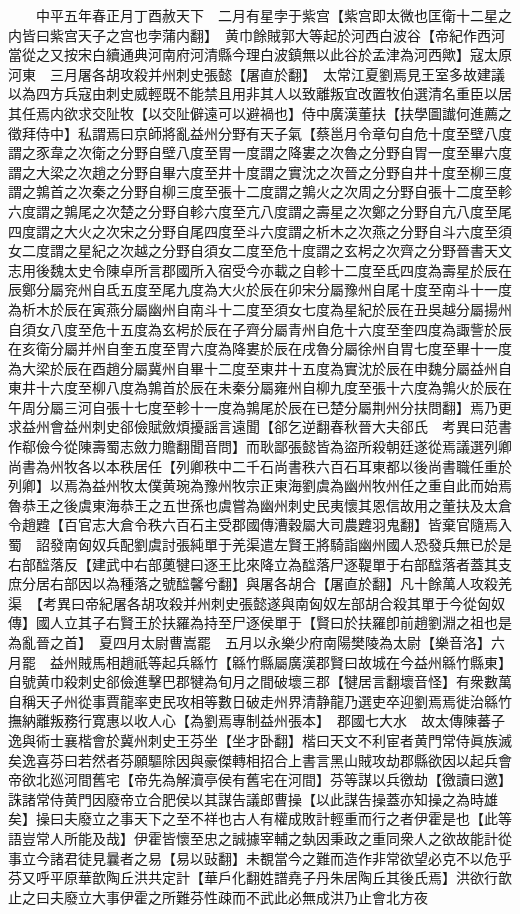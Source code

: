 　　中平五年春正月丁酉赦天下　二月有星孛于紫宫【紫宫即太微也匡衛十二星之内皆曰紫宫天子之宫也孛蒲内翻】　黄巾餘賊郭大等起於河西白波谷【帝紀作西河當從之又按宋白續通典河南府河清縣今理白波鎮無以此谷於孟津為河西歟】寇太原河東　三月屠各胡攻殺并州刺史張懿【屠直於翻】　太常江夏劉焉見王室多故建議以為四方兵寇由刺史威輕既不能禁且用非其人以致離叛宜改置牧伯選清名重臣以居其任焉内欲求交阯牧【以交阯僻遠可以避禍也】侍中廣漢董扶【扶學圖䜟何進薦之徵拜侍中】私謂焉曰京師將亂益州分野有天子氣【蔡邕月令章句自危十度至壁八度謂之豕韋之次衛之分野自壁八度至胃一度謂之降婁之次魯之分野自胃一度至畢六度謂之大梁之次趙之分野自畢六度至井十度謂之實沈之次晉之分野自井十度至柳三度謂之鶉首之次秦之分野自柳三度至張十二度謂之鶉火之次周之分野自張十二度至軫六度謂之鶉尾之次楚之分野自軫六度至亢八度謂之壽星之次鄭之分野自亢八度至尾四度謂之大火之次宋之分野自尾四度至斗六度謂之析木之次燕之分野自斗六度至須女二度謂之星紀之次越之分野自須女二度至危十度謂之玄枵之次齊之分野晉書天文志用後魏太史令陳卓所言郡國所入宿受今亦載之自軫十二度至氐四度為壽星於辰在辰鄭分屬兖州自氐五度至尾九度為大火於辰在卯宋分屬豫州自尾十度至南斗十一度為析木於辰在寅燕分屬幽州自南斗十二度至須女七度為星紀於辰在丑吳越分屬揚州自須女八度至危十五度為玄枵於辰在子齊分屬青州自危十六度至奎四度為諏訾於辰在亥衛分屬并州自奎五度至胃六度為降婁於辰在戌魯分屬徐州自胃七度至畢十一度為大梁於辰在酉趙分屬冀州自畢十二度至東井十五度為實沈於辰在申魏分屬益州自東井十六度至柳八度為鶉首於辰在未秦分屬雍州自柳九度至張十六度為鶉火於辰在午周分屬三河自張十七度至軫十一度為鶉尾於辰在已楚分屬荆州分扶問翻】焉乃更求益州會益州刺史郤儉賦斂煩擾謡言遠聞【郤乞逆翻春秋晉大夫郤氏　考異曰范書作郗儉今從陳壽蜀志斂力贍翻聞音問】而耿鄙張懿皆為盜所殺朝廷遂從焉議選列卿尚書為州牧各以本秩居任【列卿秩中二千石尚書秩六百石耳東都以後尚書職任重於列卿】以焉為益州牧太僕黄琬為豫州牧宗正東海劉虞為幽州牧州任之重自此而始焉魯恭王之後虞東海恭王之五世孫也虞嘗為幽州刺史民夷懷其恩信故用之董扶及太倉令趙韙【百官志大倉令秩六百石主受郡國傳漕穀屬大司農韙羽鬼翻】皆棄官隨焉入蜀　詔發南匈奴兵配劉虞討張純單于羌渠遣左賢王將騎詣幽州國人恐發兵無已於是右部䤈落反【建武中右部薁犍曰逐王比來降立為䤈落尸逐鞮單于右部䤈落者蓋其支庶分居右部因以為種落之號䤈馨兮翻】與屠各胡合【屠直於翻】凡十餘萬人攻殺羌渠　【考異曰帝紀屠各胡攻殺并州刺史張懿遂與南匈奴左部胡合殺其單于今從匈奴傳】國人立其子右賢王於扶羅為持至尸逐侯單于【賢曰於扶羅卽前趙劉淵之祖也是為亂晉之首】　夏四月太尉曹嵩罷　五月以永樂少府南陽樊陵為太尉【樂音洛】六月罷　益州賊馬相趙祇等起兵緜竹【緜竹縣屬廣漢郡賢曰故城在今益州緜竹縣東】自號黄巾殺刺史郤儉進擊巴郡犍為旬月之間破壞三郡【犍居言翻壞音怪】有衆數萬自稱天子州從事賈龍率吏民攻相等數日破走州界清静龍乃選吏卒迎劉焉焉徙治緜竹撫納離叛務行寛惠以收人心【為劉焉專制益州張本】　郡國七大水　故太傳陳蕃子逸與術士襄楷會於冀州刺史王芬坐【坐才卧翻】楷曰天文不利宦者黄門常侍眞族滅矣逸喜芬曰若然者芬願驅除因與豪傑轉相招合上書言黑山賊攻劫郡縣欲因以起兵會帝欲北廵河間舊宅【帝先為解瀆亭侯有舊宅在河間】芬等謀以兵徼劫【徼讀曰邀】誅諸常侍黄門因廢帝立合肥侯以其謀告議郎曹操【以此謀告操蓋亦知操之為時雄矣】操曰夫廢立之事天下之至不祥也古人有權成敗計輕重而行之者伊霍是也【此等語豈常人所能及哉】伊霍皆懷至忠之誠據宰輔之埶因秉政之重同衆人之欲故能計從事立今諸君徒見曩者之易【易以䜴翻】未覩當今之難而造作非常欲望必克不以危乎芬又呼平原華歆陶丘洪共定計【華戶化翻姓譜堯子丹朱居陶丘其後氏焉】洪欲行歆止之曰夫廢立大事伊霍之所難芬性疎而不武此必無成洪乃止會北方夜